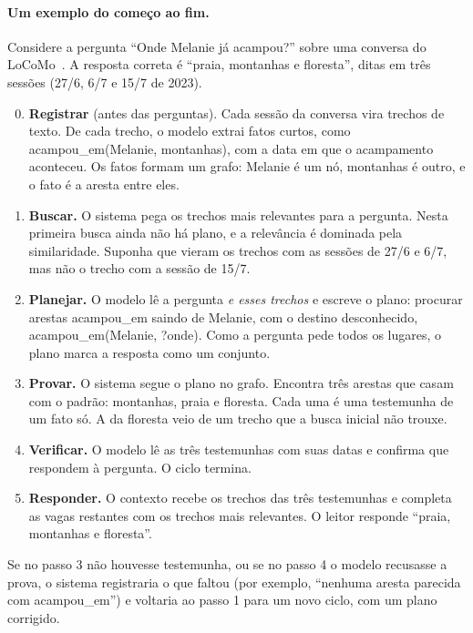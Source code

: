 \documentclass[11pt]{article}
\newcommand{\rel}[1]{\textsf{#1}}
\newcommand{\inc}[1]{\textsf{?#1}}
\begin{document}
\paragraph{Um exemplo do começo ao fim.} Considere a pergunta ``Onde Melanie
já acampou?'' sobre uma conversa do LoCoMo~\citep{maharana2024locomo}. A
resposta correta é ``praia, montanhas e floresta'', ditas em três sessões
(27/6, 6/7 e 15/7 de 2023).
\begin{enumerate}[leftmargin=*,itemsep=3pt]
\setcounter{enumi}{-1}
\item \textbf{Registrar} (antes das perguntas). Cada sessão da conversa vira
  trechos de texto. De cada trecho, o modelo extrai fatos curtos, como
  \rel{acampou\_em}(Melanie, montanhas), com a data em que o acampamento
  aconteceu. Os fatos formam um grafo: Melanie é um nó, montanhas é outro, e o
  fato é a aresta entre eles.
\item \textbf{Buscar.} O sistema pega os trechos mais relevantes para a
  pergunta. Nesta primeira busca ainda não há plano, e a relevância é dominada
  pela similaridade. Suponha que vieram os trechos com as sessões de 27/6 e
  6/7, mas não o trecho com a sessão de 15/7.
\item \textbf{Planejar.} O modelo lê a pergunta \emph{e esses trechos} e
  escreve o plano: procurar arestas \rel{acampou\_em} saindo de Melanie, com
  o destino desconhecido, \rel{acampou\_em}(Melanie, \inc{onde}). Como a
  pergunta pede todos os lugares, o plano marca a resposta como um conjunto.
\item \textbf{Provar.} O sistema segue o plano no grafo. Encontra três
  arestas que casam com o padrão: montanhas, praia e floresta. Cada uma é uma
  testemunha de um fato só. A da floresta veio de um trecho que a busca
  inicial não trouxe.
\item \textbf{Verificar.} O modelo lê as três testemunhas com suas datas e
  confirma que respondem à pergunta. O ciclo termina.
\item \textbf{Responder.} O contexto recebe os trechos das três testemunhas
  e completa as vagas restantes com os trechos mais relevantes. O leitor
  responde ``praia, montanhas e floresta''.
\end{enumerate}

Se no passo 3 não houvesse testemunha, ou se no passo 4 o modelo recusasse a
prova, o sistema registraria o que faltou (por exemplo, ``nenhuma aresta
parecida com \rel{acampou\_em}'') e voltaria ao passo 1 para um novo ciclo,
com um plano corrigido.
\end{document}

